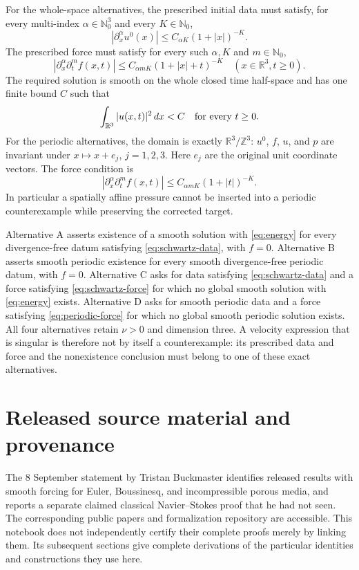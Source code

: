 \documentclass[11pt,a4paper]{article}
\theoremstyle{definition}
\theoremstyle{remark}
\newcommand{\R}{\mathbb R}
\newcommand{\Z}{\mathbb Z}
\begin{document}
For the whole-space alternatives, the prescribed initial data must satisfy,
for every multi-index $\alpha\in\mathbb N_0^3$ and every $K\in\mathbb N_0$,
\begin{equation}\label{eq:schwartz-data}
|\partial_x^\alpha u^0(x)|\le C_{\alpha K}(1+|x|)^{-K}.
\end{equation}
The prescribed force must satisfy for every such $\alpha,K$ and
$m\in\mathbb N_0$,
\begin{equation}\label{eq:schwartz-force}
|\partial_x^\alpha\partial_t^mf(x,t)|
\le C_{\alpha m K}(1+|x|+t)^{-K}\quad(x\in\R^3,t\ge0).
\end{equation}
The required solution is smooth on the whole closed time half-space and has
one finite bound $C$ such that
\begin{equation}\label{eq:energy}
\int_{\R^3}|u(x,t)|^2\,dx<C\quad\hbox{for every }t\ge0.
\end{equation}
For the periodic alternatives, the domain is exactly $\R^3/\Z^3$:
$u^0$, $f$, $u$, and $p$ are invariant under $x\mapsto x+e_j$,
$j=1,2,3$. Here $e_j$ are the original unit coordinate vectors. The force
condition is
\begin{equation}\label{eq:periodic-force}
|\partial_x^\alpha\partial_t^mf(x,t)|
\le C_{\alpha m K}(1+|t|)^{-K}.
\end{equation}
In particular a spatially affine pressure cannot be inserted into a periodic
counterexample while preserving the corrected target.

Alternative A asserts existence of a smooth solution with
\eqref{eq:energy} for every divergence-free datum satisfying
\eqref{eq:schwartz-data}, with $f=0$. Alternative B asserts smooth periodic
existence for every smooth divergence-free periodic datum, with $f=0$.
Alternative C asks for data satisfying \eqref{eq:schwartz-data} and a force
satisfying \eqref{eq:schwartz-force} for which no global smooth solution with
\eqref{eq:energy} exists. Alternative D asks for smooth periodic data and a
force satisfying \eqref{eq:periodic-force} for which no global smooth periodic
solution exists. All four alternatives retain $\nu>0$ and dimension three.
A velocity expression that is singular is therefore not by itself a
counterexample: its prescribed data and force and the nonexistence conclusion
must belong to one of these exact alternatives.

\section{Released source material and provenance}
\label{sec:sources}
The 8 September statement by Tristan Buckmaster identifies released results
with smooth forcing for Euler, Boussinesq, and incompressible porous media,
and reports a separate claimed classical Navier--Stokes proof that he had
not seen\cite{BuckmasterStatement}. The corresponding public papers and
formalization repository are accessible\cite{Euler,Boussinesq,FluidLean}.
This notebook does not independently certify their complete proofs merely by
linking them. Its subsequent sections give complete derivations of the
particular identities and constructions they use here.
\end{document}
